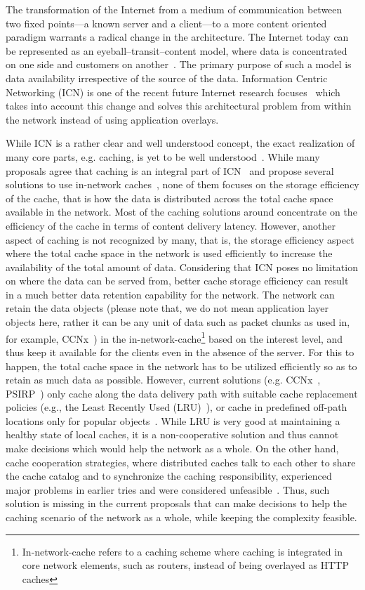\documentclass[article]{elsarticle}
\begin{document}
The transformation of the Internet from a medium of communication between two fixed points---a known server and a client---to a more content oriented paradigm warrants a radical change in the architecture. The Internet today can be represented as an eyeball--transit--content model, where data is concentrated on one side and customers on another~\cite{eyeball}. The primary purpose of such a model is data availability irrespective of the source of the data. Information Centric Networking (ICN) is one of the recent future Internet research focuses~\cite{dona,ccn} which takes into account this change and solves this architectural problem from within the network instead of using application overlays.

While ICN is a rather clear and well understood concept, the exact realization of many core parts, e.g. caching, is yet to be well understood~\cite{icn2011}. While many proposals agree that caching is an integral part of ICN~\cite{4ward, psirp, sail} and propose several solutions to use in-network caches~\cite{diallo2013, kurose2009}, none of them focuses on the storage efficiency of the cache, that is how the data is distributed across the total cache space available in the network. Most of the caching solutions around concentrate on the efficiency of the cache in terms of content delivery latency. However, another aspect of caching is not recognized by many, that is, the storage efficiency aspect where the total cache space in the network is used efficiently to increase the availability of the total amount of data. Considering that ICN poses no limitation on where the data can be served from, better cache storage efficiency can result in a much better data retention capability for the network. The network can retain the data objects (please note that, we do not mean application layer objects here, rather it can be any unit of data such as packet chunks as used in, for example, CCNx~\cite{ccn}) in the in-network-cache\footnote{In-network-cache refers to a caching scheme where caching is integrated in core network elements, such as routers, instead of being overlayed as HTTP caches} based on the interest level, and thus keep it available for the clients even in the absence of the server. For this to happen, the total cache space in the network has to be utilized efficiently so as to retain as much data as possible. However, current solutions (e.g. CCNx~\cite{ccn}, PSIRP~\cite{psirp}) only cache along the data delivery path with suitable cache replacement policies (e.g., the Least Recently Used (LRU)~\cite{cache_policy}), or cache in predefined off-path locations only for popular objects~\cite{psirp3}. While LRU is very good at maintaining a healthy state of local caches, it is a non-cooperative solution and thus cannot make decisions which would help the network as a whole. On the other hand, cache cooperation strategies, where distributed caches talk to each other to share the cache catalog and to synchronize the caching responsibility, experienced major problems in earlier tries and were considered unfeasible~\cite{cache_coop}. Thus, such solution is missing in the current proposals that can make decisions to help the caching scenario of the network as a whole, while keeping the complexity feasible.
\end{document}

